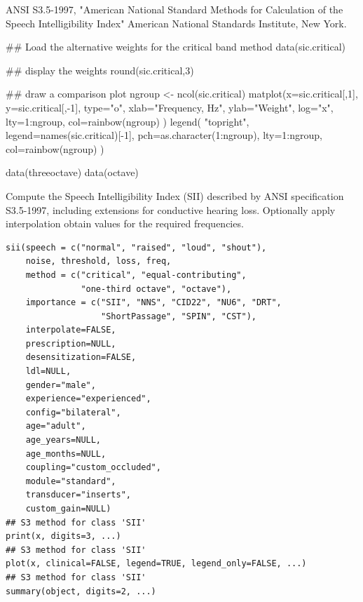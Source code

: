 \documentclass[letterpaper]{book}
\begin{document}
%
\begin{References}
ANSI S3.5-1997, "American National Standard Methods for 
Calculation of the Speech Intelligibility Index" American National
Standards Institute, New York. 
\end{References}
%
\begin{Examples}
\begin{ExampleCode}
## Load the alternative weights for the critical band method
data(sic.critical)

## display the weights
round(sic.critical,3)

## draw a comparison plot
ngroup <- ncol(sic.critical)
matplot(x=sic.critical[,1], y=sic.critical[,-1],
        type="o",
        xlab="Frequency, Hz",
        ylab="Weight",
        log="x",
        lty=1:ngroup,
        col=rainbow(ngroup)
)
legend(
       "topright",
       legend=names(sic.critical)[-1],
       pch=as.character(1:ngroup),
       lty=1:ngroup,
       col=rainbow(ngroup)
       )

data(threeoctave)
data(octave)
\end{ExampleCode}
\end{Examples}
%
\begin{Description}
Compute the Speech Intelligibility Index (SII) described by ANSI
specification S3.5-1997, including extensions for conductive
hearing loss. Optionally apply interpolation obtain values for the
required frequencies.
\end{Description}
%
\begin{Usage}
\begin{verbatim}
sii(speech = c("normal", "raised", "loud", "shout"),
    noise, threshold, loss, freq, 
    method = c("critical", "equal-contributing",
               "one-third octave", "octave"),
    importance = c("SII", "NNS", "CID22", "NU6", "DRT",
                   "ShortPassage", "SPIN", "CST"),
    interpolate=FALSE,
    prescription=NULL,
    desensitization=FALSE,
    ldl=NULL,
    gender="male",
    experience="experienced",
    config="bilateral",
    age="adult",
    age_years=NULL,
    age_months=NULL,
    coupling="custom_occluded",
    module="standard",
    transducer="inserts",
    custom_gain=NULL)
## S3 method for class 'SII'
print(x, digits=3, ...)
## S3 method for class 'SII'
plot(x, clinical=FALSE, legend=TRUE, legend_only=FALSE, ...)
## S3 method for class 'SII'
summary(object, digits=2, ...)
\end{verbatim}
\end{Usage}
\end{document}
